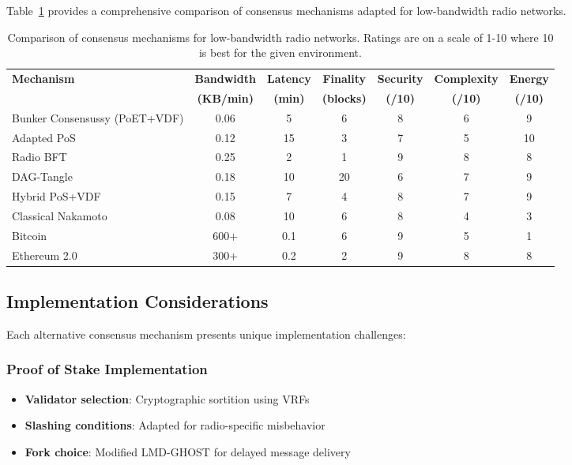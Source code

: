 \documentclass[11pt,a4paper]{article}
\begin{document}
Table~\ref{tab:consensus_comparison} provides a comprehensive comparison of consensus mechanisms adapted for low-bandwidth radio networks.

\begin{table}[h]
\centering
\begin{tabular}{|l|c|c|c|c|c|c|}
\hline
\textbf{Mechanism} & \textbf{Bandwidth} & \textbf{Latency} & \textbf{Finality} & \textbf{Security} & \textbf{Complexity} & \textbf{Energy} \\
 & \textbf{(KB/min)} & \textbf{(min)} & \textbf{(blocks)} & \textbf{(/10)} & \textbf{(/10)} & \textbf{(/10)} \\
\hline
Bunker Consensussy (PoET+VDF) & 0.06 & 5 & 6 & 8 & 6 & 9 \\
\hline
Adapted PoS & 0.12 & 15 & 3 & 7 & 5 & 10 \\
\hline
Radio BFT & 0.25 & 2 & 1 & 9 & 8 & 8 \\
\hline
DAG-Tangle & 0.18 & 10 & 20 & 6 & 7 & 9 \\
\hline
Hybrid PoS+VDF & 0.15 & 7 & 4 & 8 & 7 & 9 \\
\hline
Classical Nakamoto & 0.08 & 10 & 6 & 8 & 4 & 3 \\
\hline
Bitcoin & 600+ & 0.1 & 6 & 9 & 5 & 1 \\
\hline
Ethereum 2.0 & 300+ & 0.2 & 2 & 9 & 8 & 8 \\
\hline
\end{tabular}
\caption{Comparison of consensus mechanisms for low-bandwidth radio networks. Ratings are on a scale of 1-10 where 10 is best for the given environment.}
\label{tab:consensus_comparison}
\end{table}

\subsection{Implementation Considerations}

Each alternative consensus mechanism presents unique implementation challenges:

\subsubsection{Proof of Stake Implementation}

\begin{itemize}
\item \textbf{Validator selection}: Cryptographic sortition using VRFs
\item \textbf{Slashing conditions}: Adapted for radio-specific misbehavior
\item \textbf{Fork choice}: Modified LMD-GHOST for delayed message delivery
\end{itemize}
\end{document}
